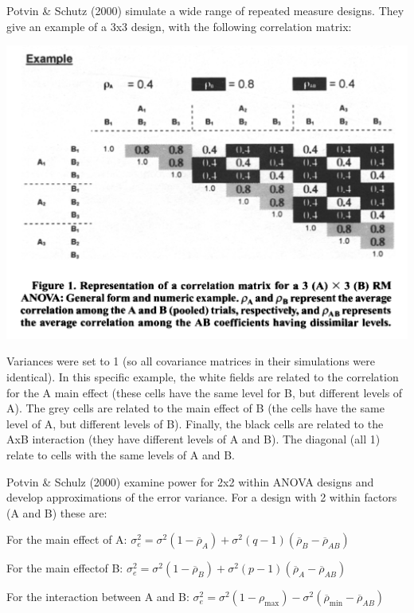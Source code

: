 \documentclass[]{book}
\begin{document}
Potvin \& Schutz (2000) simulate a wide range of repeated measure designs. They give an example of a 3x3 design, with the following correlation matrix:

\includegraphics{screenshots/PS2000.png}

Variances were set to 1 (so all covariance matrices in their simulations were identical). In this specific example, the white fields are related to the correlation for the A main effect (these cells have the same level for B, but different levels of A). The grey cells are related to the main effect of B (the cells have the same level of A, but different levels of B). Finally, the black cells are related to the AxB interaction (they have different levels of A and B). The diagonal (all 1) relate to cells with the same levels of A and B.

Potvin \& Schulz (2000) examine power for 2x2 within ANOVA designs and develop approximations of the error variance. For a design with 2 within factors (A and B) these are:

For the main effect of A:
\(\sigma _ { e } ^ { 2 } = \sigma ^ { 2 } ( 1 - \overline { \rho } _ { A } ) + \sigma ^ { 2 } ( q - 1 ) ( \overline { \rho } _ { B } - \overline { \rho } _ { AB } )\)

For the main effectof B:
\(\sigma _ { e } ^ { 2 } = \sigma ^ { 2 } ( 1 - \overline { \rho } _ { B } ) + \sigma ^ { 2 } ( p - 1 ) ( \overline { \rho } _ { A } - \overline { \rho } _ { A B } )\)

For the interaction between A and B:
\(\sigma _ { e } ^ { 2 } = \sigma ^ { 2 } ( 1 - \rho _ { \max } ) - \sigma ^ { 2 } ( \overline { \rho } _ { \min } - \overline { \rho } _ { AB } )\)
\end{document}

